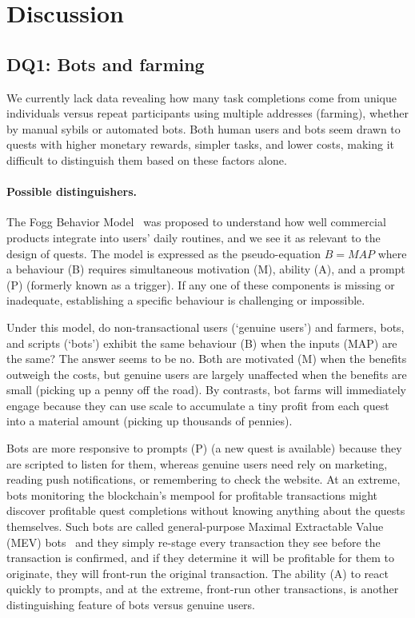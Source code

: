 
\section{Discussion}

\subsection{DQ1: Bots and farming}

We currently lack data revealing how many task completions come from unique individuals versus repeat participants using multiple addresses (farming), whether by manual sybils or automated bots. Both human users and bots seem drawn to quests with higher monetary rewards, simpler tasks, and lower costs, making it difficult to distinguish them based on these factors alone.

\paragraph{Possible distinguishers.} The Fogg Behavior Model~\cite{Fogg09} was proposed to understand how well commercial products integrate into users’ daily routines, and we see it as relevant to the design of quests. The model is expressed as the pseudo-equation $B=MAP$ where a behaviour (B) requires simultaneous motivation (M), ability (A), and a prompt (P) (formerly known as a trigger). If any one of these components is missing or inadequate, establishing a specific behaviour is challenging or impossible.

Under this model, do non-transactional users (`genuine users') and farmers, bots, and scripts (`bots') exhibit the same behaviour (B) when the inputs (MAP) are the same? The answer seems to be no. Both are motivated (M) when the benefits outweigh the costs, but genuine users are largely unaffected when the benefits are small (\cf picking up a penny off the road). By contrasts, bot farms will immediately engage because they can use scale to accumulate a tiny profit from each quest into a material amount (\cf picking up thousands of pennies).

Bots are more responsive to prompts (P) (\eg a new quest is available) because they are scripted to listen for them, whereas genuine users need rely on marketing, reading push notifications, or remembering to check the website. At an extreme, bots monitoring the blockchain's mempool for profitable transactions might discover profitable quest completions without knowing anything about the quests themselves. Such bots are called general-purpose Maximal Extractable Value (MEV) bots~\cite{DGK+20} and they simply re-stage every transaction they see before the transaction is confirmed, and if they determine it will be profitable for them to originate, they will front-run the original transaction. The ability (A) to react quickly to prompts, and at the extreme, front-run other transactions, is another distinguishing feature of bots versus genuine users. 

